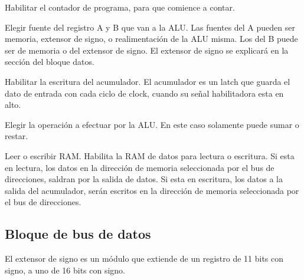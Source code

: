 \documentclass{article}
\begin{document}
\begin{description}[font=$\bullet$~\normalfont\scshape\color{red!50!black}]
\item Habilitar el contador de programa, para que comience a contar.
\item Elegir fuente del registro A y B que van a la ALU. Las fuentes del A pueden ser
memoria, extensor de signo, o realimentación de la ALU misma. Los del B puede ser de
memoria o del extensor de signo. El extensor de signo se explicará en la sección del bloque
datos.
\item Habilitar la escritura del acumulador. El acumulador es un latch que guarda el dato de
entrada con cada ciclo de clock, cuando su señal habilitadora esta en alto.
\item Elegir la operación a efectuar por la ALU. En este caso solamente puede sumar o restar.
\item Leer o escribir RAM. Habilita la RAM de datos para lectura o escritura. Si esta en lectura,
los datos en la dirección de memoria seleccionada por el bus de direcciones, saldran por la salida
de datos. Si esta en escritura, los datos a la salida del acumulador, serán escritos en la dirección
de memoria seleccionada por el bus de direcciones.

\end{description}

\newpage

\subsection{Bloque de bus de datos}


El extensor de signo es un módulo que extiende de un registro
de 11 bits con signo, a uno de 16 bits con signo.
\newpage
\end{document}
